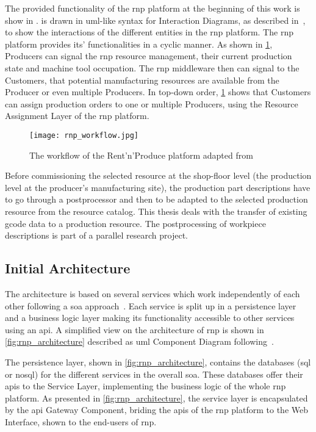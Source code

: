 \documentclass[
a4paper,
twoside,
headsepline,
cleardoublepage=empty,
parskip=half,
draft=false
]{scrbook}
\begin{document}
			The provided functionality of the \gls{rnp} platform at the beginning of this work is show in .  is drawn in \gls{uml}-like syntax for Interaction Diagrams, as described in~\cite{uml2017}, to show the interactions of the different entities in the \gls{rnp} platform. 
			The \gls{rnp} platform provides its' functionalities in a cyclic manner. 
			As shown in \cref{fig:rnp_workflow}, Producers can signal the \gls{rnp} resource management, their current production state and machine tool occupation. 
			The \gls{rnp} middleware then can signal to the Customers, that potential manufacturing resources are available from the Producer or even multiple Producers. 
			In top-down order, \cref{fig:rnp_workflow} shows that Customers can assign production orders to one or multiple Producers, using the Resource Assignment Layer of the \gls{rnp} platform.

			\begin{figure}[H]
				\centering
				\texttt{[image: rnp\_workflow.jpg]}
				\caption{The workflow of the Rent'n'Produce platform adapted from~\cite{ellwein2016}}
				\label{fig:rnp_workflow}
			\end{figure}

			Before commissioning the selected resource at the shop-floor level (the production level at the producer's manufacturing site), the production part descriptions have to go through a postprocessor and then to be adapted to the selected production resource from the resource catalog.
			This thesis deals with the transfer of existing \gls{gcode} data to a production resource.
			The postprocessing of workpiece descriptions is part of a parallel research project.

			\subsection{Initial Architecture}\label{subsec:initial_architecture}

			The architecture is based on several services which work independently of each other following a \gls{soa} approach~\cite{erl2008soa}.
			Each service is split up in a persistence layer and a business logic layer making its functionality accessible to other services using an \gls{api}.
			A simplified view on the architecture of \gls{rnp} is shown in \cref{fig:rnp_architecture} described as \gls{uml} Component Diagram following~\cite{uml2017}.
			
			The persistence layer, shown in \cref{fig:rnp_architecture}, contains the databases (\gls{sql} or \gls{nosql}) for the different services in the overall \gls{soa}. These databases offer their \gls{api}s to the Service Layer, implementing the business logic of the whole \gls{rnp} platform. As presented in \cref{fig:rnp_architecture}, the service layer is encapsulated by the \gls{api} Gateway Component, briding the \gls{api}s of the \gls{rnp} platform to the Web Interface, shown to the end-users of \gls{rnp}.
\end{document}
